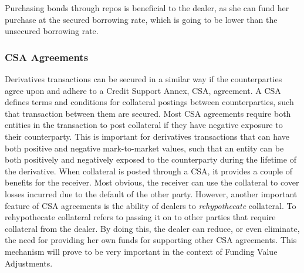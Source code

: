 \documentclass[main.tex]{subfiles}
\begin{document}
        Purchasing bonds through repos is beneficial to the dealer,
        as she can fund her purchase at the secured borrowing rate,
        which is going to be lower than the unsecured borrowing rate.

        \subsubsection{CSA Agreements}
        Derivatives transactions can be secured in a similar way 
        if the counterparties agree upon and adhere to a Credit Support Annex, CSA, agreement.
        A CSA defines terms and conditions for collateral postings between counterparties, 
        such that transaction between them are secured.
        Most CSA agreements require both entities in the transaction to post collateral 
        if they have negative exposure to their counterparty. 
        This is important for derivatives transactions that can have both 
        positive and negative mark-to-market values, 
        such that an entity can be both positively and negatively exposed to the counterparty
        during the lifetime of the derivative.
        When collateral is posted through a CSA, it provides a couple of benefits for the receiver.
        Most obvious, the receiver can use the collateral to cover losses incurred 
        due to the default of the other party.
        However, another important feature of CSA agreements is the ability of dealers to
        \textit{rehypothecate} collateral.
        To rehypothecate collateral refers to passing it on to other parties that
        require collateral from the dealer.
        By doing this, the dealer can reduce, or even eliminate, the need for providing her own funds
        for supporting other CSA agreements. 
        This mechanism will prove to be very important in the context of Funding Value Adjustments.
\end{document}
